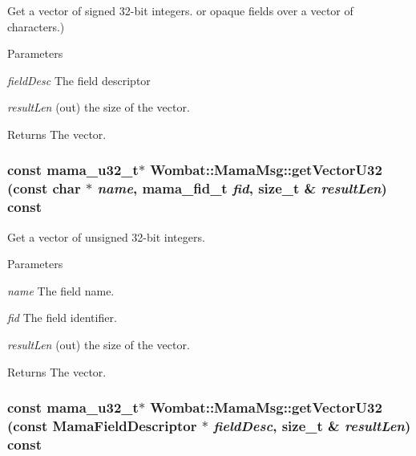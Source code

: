 Get a vector of signed 32-\/bit integers. or opaque fields over a vector of characters.) 
\begin{DoxyParams}{Parameters}
\item[{\em fieldDesc}]The field descriptor \item[{\em resultLen}](out) the size of the vector. \end{DoxyParams}
\begin{DoxyReturn}{Returns}
The vector. 
\end{DoxyReturn}
\hypertarget{classWombat_1_1MamaMsg_a1de21a544bad98ebf4a6cb30f241bf7e}{
\subsubsection[{getVectorU32}]{\setlength{\rightskip}{0pt plus 5cm}const mama\_\-u32\_\-t$\ast$ Wombat::MamaMsg::getVectorU32 (const char $\ast$ {\em name}, \/  mama\_\-fid\_\-t {\em fid}, \/  size\_\-t \& {\em resultLen}) const}}
\label{classWombat_1_1MamaMsg_a1de21a544bad98ebf4a6cb30f241bf7e}


Get a vector of unsigned 32-\/bit integers. 
\begin{DoxyParams}{Parameters}
\item[{\em name}]The field name. \item[{\em fid}]The field identifier. \item[{\em resultLen}](out) the size of the vector. \end{DoxyParams}
\begin{DoxyReturn}{Returns}
The vector. 
\end{DoxyReturn}
\hypertarget{classWombat_1_1MamaMsg_a5fa8cbacf9e5f8fef18be507b9cb685c}{
\subsubsection[{getVectorU32}]{\setlength{\rightskip}{0pt plus 5cm}const mama\_\-u32\_\-t$\ast$ Wombat::MamaMsg::getVectorU32 (const {\bf MamaFieldDescriptor} $\ast$ {\em fieldDesc}, \/  size\_\-t \& {\em resultLen}) const}}
\label{classWombat_1_1MamaMsg_a5fa8cbacf9e5f8fef18be507b9cb685c}


